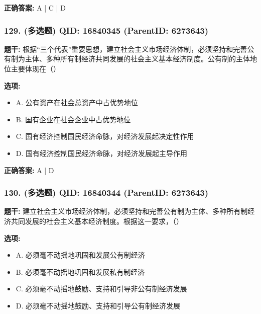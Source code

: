 \documentclass[12pt,UTF8]{ctexart}
\begin{document}
\textbf{正确答案:}
A | C | D

\vspace{0.3em}\hrulefill\vspace{0.7em}

\subsubsection*{129. (多选题) \small QID: 16840345 (ParentID: 6273643)}

\textbf{题干:}
根据“三个代表”重要思想，建立社会主义市场经济体制，必须坚持和完善公有制为主体、多种所有制经济共同发展的社会主义基本经济制度。公有制的主体地位主要体现在（）



\textbf{选项:}
\begin{itemize}[leftmargin=*]

  \item A. 公有资产在社会总资产中占优势地位

  \item B. 国有企业在社会企业中占优势地位

  \item C. 国有经济控制国民经济命脉，对经济发展起决定性作用

  \item D. 国有经济控制国民经济命脉，对经济发展起主导作用

\end{itemize}

\textbf{正确答案:}
A | D

\vspace{0.3em}\hrulefill\vspace{0.7em}

\subsubsection*{130. (多选题) \small QID: 16840344 (ParentID: 6273643)}

\textbf{题干:}
建立社会主义市场经济体制，必须坚持和完善公有制为主体、多种所有制经济共同发展的社会主义基本经济制度。根据这一要求，（）



\textbf{选项:}
\begin{itemize}[leftmargin=*]

  \item A. 必须毫不动摇地巩固和发展公有制经济

  \item B. 必须毫不动摇地巩固和发展私有制经济

  \item C. 必须毫不动摇地鼓励、支持和引导非公有制经济发展

  \item D. 必须毫不动摇地鼓励、支持和引导公有制经济发展

\end{itemize}
\end{document}
